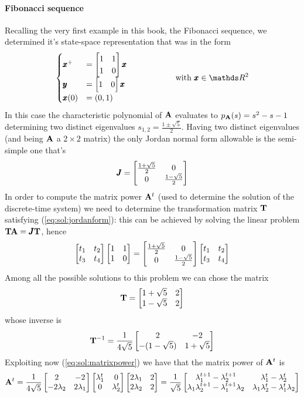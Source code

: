	\paragraph{Fibonacci sequence} Recalling the very first example in this book, the Fibonacci sequence, we determined it's state-space representation that was in the form
	\[ \begin{cases}
		\xp & = \matrix{1 & 1 \\ 1 & 0} \x \\ \y & = \matrix{1&0}\x \\ \x(0) & = (0,1)
	\end{cases} \hspace{2cm} \text{with } \x \in \mathds R^2\]
	In this case the characteristic polynomial of $\mathbf{A}$ evaluates to $p_{\mathbf{A}}(s) = s^2-s-1$ determining two distinct eigenvalues $s_{1,2} = \frac{1\pm \sqrt 5}{2}$. Having two distinct eigenvalues (and being $\mathbf{A}$ a $2\times 2$ matrix) the only Jordan normal form allowable is the semi-simple one that's
	\[ \pmb{J} = \begin{bmatrix} \frac{1+\sqrt 5}{2} & 0 \\ 0 & \frac{1-\sqrt 5}{2} \end{bmatrix} \]
	In order to compute the matrix power $\mathbf{A}^t$ (used to determine the solution of the discrete-time system) we need to determine the transformation matrix $\mathbf{T}$ satisfying (\ref{eq:sol:jordanform}): this can be achieved by solving the linear problem $\mathbf{T} \mathbf{A}= \pmb{J} \mathbf{T}$, hence
	\[ \begin{bmatrix} t_1 & t_2 \\ t_3 & t_4 \end{bmatrix} \begin{bmatrix} 1 & 1 \\ 1 & 0  \end{bmatrix} = \begin{bmatrix} \frac{1+\sqrt 5}{2} & 0 \\ 0 & \frac{1-\sqrt 5}{2} \end{bmatrix} \begin{bmatrix} t_1 & t_2 \\ t_3 & t_4 \end{bmatrix} \]
	Among all the possible solutions to this problem we can chose the matrix
	\[ \mathbf{T} = \begin{bmatrix} 1+\sqrt 5 & 2 \\ 1-\sqrt 5 & 2 \end{bmatrix} \]
	whose inverse is
	\[ \mathbf{T}^{-1} = \frac{1}{4\sqrt 5} \begin{bmatrix} 2 & - 2 \\ -(1-\sqrt 5) & 1+\sqrt 5 \end{bmatrix} \]
	Exploiting now (\ref{eq:sol:matrixpower}) we have that the matrix power of $\mathbf{A}^t$ is 
	\[ \mathbf{A}^t = \frac 1 {4\sqrt 5} \begin{bmatrix} 2 & -2 \\ -2\lambda_2 & 2\lambda_1 \end{bmatrix} \begin{bmatrix} \lambda_1^t & 0 \\ 0 & \lambda_2^t \end{bmatrix} \begin{bmatrix} 2\lambda_1 & 2 \\ 2\lambda_2 & 2 \end{bmatrix} = \frac 1{\sqrt 5} \begin{bmatrix}  \lambda_1^{t+1} -\lambda_2^{t+1} & \lambda_1^t - \lambda_2^t \\ \lambda_1 \lambda_2^{t+1} - \lambda_1^{t+1} \lambda_2 & \lambda_1\lambda_2^t - \lambda_1^t \lambda_2   \end{bmatrix} \]
